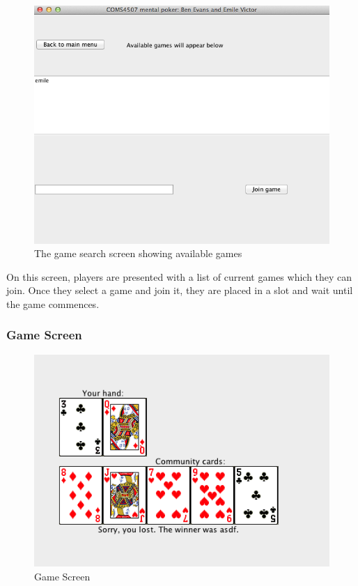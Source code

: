 \documentclass[11pt, oneside]{article}   	%
\begin{document}
\begin{figure}[h!]

\caption{The game search screen showing available games}
	\label{joinGame}
\centering
\includegraphics[bb=0 0 665 539,scale=0.55]{images/joinGame.png}
\end{figure}

On this screen, players are presented with a list of current games which they can join. Once they select a game and join it, they are placed in a slot and wait until the game commences.

\pagebreak
\subsubsection{Game Screen}

\begin{figure}[h!]

\caption{Game Screen}
	\label{commCards}
\centering
\includegraphics[bb=0 0 485 348,scale=0.7]{images/commCards.png}
\end{figure}
\end{document}
